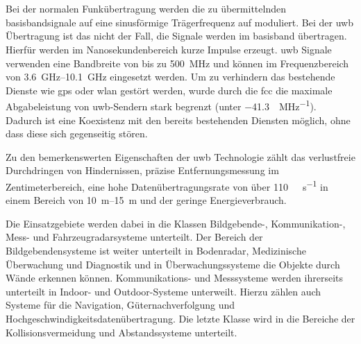 %
%
\chapter{}
\label{ch:uwb}

Bei der normalen Funkübertragung werden die zu übermittelnden \Gls{basisband}signale auf eine sinusförmige Trägerfrequenz auf moduliert. Bei der \Gls{uwb} Übertragung ist das nicht der Fall, die Signale werden im \Gls{basisband} übertragen. Hierfür werden im Nanosekundenbereich kurze Impulse erzeugt. \Gls{uwb} Signale verwenden eine Bandbreite von bis zu \SI{500}{\MHz} und können im Frequenzbereich von \SIrange{3.6}{10.1}{\GHz} eingesetzt werden. Um zu verhindern das bestehende Dienste wie \Gls{gps} oder \Gls{wlan} gestört werden, wurde durch die \Gls{fcc} die maximale Abgabeleistung von \Gls{uwb}-Sendern stark begrenzt (unter \SI[per-mode=symbol]{-41.3}{\dBm\per\MHz}). Dadurch ist eine Koexistenz mit den bereits bestehenden Diensten möglich, ohne dass diese sich gegenseitig stören. \cite{win1998impulse, yang2004uwbcom, fontana2004recent, aiello2006ultra, yavari2014ultra}

Zu den bemerkenswerten Eigenschaften der \Gls{uwb} Technologie zählt das verlustfreie Durchdringen von Hindernissen, präzise Entfernungsmessung im Zentimeterbereich, eine hohe Datenübertragungsrate von über \SI[per-mode=symbol]{110}{\mega\byte\per\second} in einem Bereich von \SIrange{10}{15}{\metre} und der geringe Energieverbrauch. \cite{yang2004uwbcom}

Die Einsatzgebiete werden dabei in die Klassen Bildgebende-, Kommunikation-, Mess- und Fahrzeugradarsysteme unterteilt. Der Bereich der Bildgebendensysteme ist weiter unterteilt in Bodenradar, Medizinische Überwachung und Diagnostik und in Überwachungssysteme die Objekte durch Wände erkennen können. Kommunikations- und Messsysteme werden ihrerseits unterteilt in Indoor- und Outdoor-Systeme unterweilt. Hierzu zählen auch Systeme für die Navigation, Güternachverfolgung und Hochgeschwindigkeitsdatenübertragung. Die letzte Klasse wird in die Bereiche der Kollisionsvermeidung und Abstandssysteme unterteilt. \cite{yang2004uwbcom, lakkundi2006ultra, pan2007medical}


%
%
%
